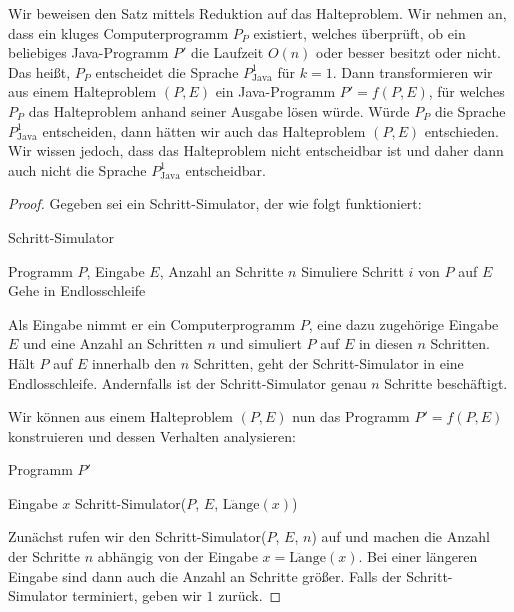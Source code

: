 \documentclass[journal]{IEEEtran}
\begin{document}
Wir beweisen den Satz mittels Reduktion auf das Halteproblem. Wir nehmen an, dass ein kluges Computerprogramm $P_P$ existiert, welches überprüft, ob ein beliebiges Java-Programm $P'$ die Laufzeit $O(n)$ oder besser besitzt oder nicht. Das heißt, $P_P$ entscheidet die Sprache $P_\text{Java}^1$ für $k = 1$. Dann transformieren wir aus einem Halteproblem $(P, E)$ ein Java-Programm $P' = f(P, E)$, für welches $P_P$ das Halteproblem anhand seiner Ausgabe lösen würde. Würde $P_P$ die Sprache $P_\text{Java}^1$ entscheiden, dann hätten wir auch das Halteproblem $(P, E)$ entschieden. Wir wissen jedoch, dass das Halteproblem nicht entscheidbar ist und daher dann auch nicht die Sprache $P_\text{Java}^1$ entscheidbar.

\begin{proof}
Gegeben sei ein Schritt-Simulator, der wie folgt funktioniert:

\begin{algorithm}
\caption{Schritt-Simulator}
\begin{algorithmic}[1]
\renewcommand{\algorithmicrequire}{\textbf{Input:}}
\renewcommand{\algorithmicensure}{\textbf{Output:}}
\REQUIRE Programm $P$, Eingabe $E$, Anzahl an Schritte $n$
  \STATE Simuliere Schritt $i$ von $P$ auf $E$
   \STATE Gehe in Endlosschleife
  \ENDIF
 \ENDFOR
\end{algorithmic}
\end{algorithm}

Als Eingabe nimmt er ein Computerprogramm $P$, eine dazu zugehörige Eingabe $E$ und eine Anzahl an Schritten $n$ und simuliert $P$ auf $E$ in diesen $n$ Schritten. Hält $P$ auf $E$ innerhalb den $n$ Schritten, geht der Schritt-Simulator in eine Endlosschleife. Andernfalls ist der Schritt-Simulator genau $n$ Schritte beschäftigt.

Wir können aus einem Halteproblem $(P, E)$ nun das Programm $P' = f(P, E)$ konstruieren und dessen Verhalten analysieren:

\begin{algorithm}
\caption{Programm $P'$}
\begin{algorithmic}[1]
\renewcommand{\algorithmicrequire}{\textbf{Input:}}
\renewcommand{\algorithmicensure}{\textbf{Output:}}
\REQUIRE Eingabe $x$
\STATE Schritt-Simulator($P$, $E$, $\operatorname{L\ddot{a}nge}(x)$)
\end{algorithmic}
\end{algorithm}

Zunächst rufen wir den Schritt-Simulator($P$, $E$, $n$) auf und machen die Anzahl der Schritte $n$ abhängig von der Eingabe $x = \operatorname{L\ddot{a}nge}(x)$. Bei einer längeren Eingabe sind dann auch die Anzahl an Schritte größer. Falls der Schritt-Simulator terminiert, geben wir $1$ zurück.


\end{proof}
\end{document}
